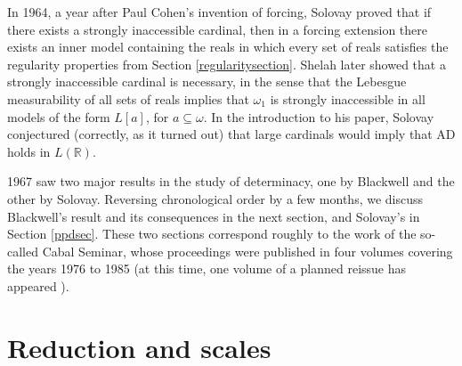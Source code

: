 \documentclass{book}%
\begin{document}
In 1964, a year after Paul Cohen's invention of forcing,
Solovay  proved that if there exists a strongly
inaccessible cardinal, then in a forcing extension there exists an
inner model containing the reals in which every set of reals
satisfies the regularity properties from Section \ref{regularitysection}. Shelah 
later showed that a strongly inaccessible cardinal is necessary, in the sense that the Lebesgue
measurability of all sets of reals implies that $\omega_{1}$ is
strongly inaccessible in all models of the form $L[a]$, for $a
\subseteq \omega$. In the introduction to his
paper, Solovay conjectured (correctly, as it turned out) that large
cardinals would imply that AD holds in $L(\mathbb{R})$.



1967 saw two major results in the study of determinacy, one by
Blackwell  and the other by Solovay.
Reversing chronological order by a few months, we discuss Blackwell's result and its consequences in the next section, and Solovay's in
Section \ref{ppdsec}. These two sections correspond roughly to the
work of the so-called Cabal Seminar, whose proceedings were published in four volumes
covering the years 1976 to 1985 \cite{Cabal:7677, Cabal:7779,
Cabal:7981, Cabal:8185} (at this time, one volume of a planned reissue has appeared \cite{KechrisLoeweSteel}).

\section{Reduction and scales}
\end{document}
